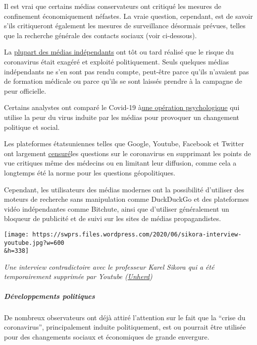 Il est vrai que certains médias conservateurs ont critiqué les mesures
de confinement économiquement néfastes. La vraie question, cependant,
est de savoir s'ils critiqueront également les mesures de surveillance
désormais prévues, telles que la recherche générale des contacts sociaux
(voir ci-dessous).

La \href{https://swprs.org/media-navigator/}{plupart des médias
indépendants} ont tôt ou tard réalisé que le risque du coronavirus était
exagéré et exploité politiquement. Seuls quelques médias indépendants ne
s'en sont pas rendu compte, peut-être parce qu'ils n'avaient pas de
formation médicale ou parce qu'ils se sont laissés prendre à la campagne
de peur officielle.

Certains analystes ont comparé le Covid-19
à\href{https://digwithin.net/2020/06/03/coronavirus-scare/}{une
opération psychologique} qui utilise la peur du virus induite par les
médias pour provoquer un changement politique et social.

Les plateformes étatsuniennes telles que Google, Youtube, Facebook et
Twitter ont largement
\href{https://nypost.com/2020/05/16/youtube-censors-epidemiologist-knut-wittkowski-for-opposing-lockdown/}{censuré}les
questions sur le coronavirus en supprimant les points de vue critiques
même des médecins ou en limitant leur diffusion, comme cela a longtemps
été la norme pour les questions géopolitiques.

Cependant, les utilisateurs des médias modernes ont la possibilité
d'utiliser des moteurs de recherche sans manipulation comme DuckDuckGo
et des plateformes vidéo indépendantes comme Bitchute, ainsi que
d'utiliser généralement un bloqueur de publicité et de suivi sur les
sites de médias propagandistes.

\texttt{[image: https://swprs.files.wordpress.com/2020/06/sikora-interview-youtube.jpg?w=600\\\&h=338]}

\emph{Une interview contradictoire avec le professeur Karel Sikora qui a
été temporairement supprimée par Youtube
(\href{https://www.youtube.com/watch?v=uk2YZfnsOPg}{Unherd})}

\hypertarget{duxe9veloppements-politiques}{%
\subparagraph{\texorpdfstring{\textbf{Développements
politiques}}{Développements politiques}}\label{duxe9veloppements-politiques}}

De nombreux observateurs ont déjà attiré l'attention sur le fait que la
``crise du coronavirus'', principalement induite politiquement, est ou
pourrait être utilisée pour des changements sociaux et économiques de
grande envergure.

